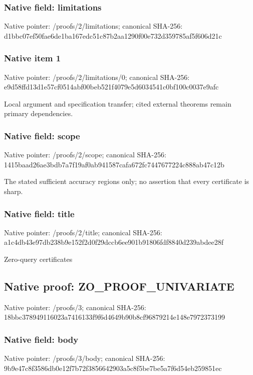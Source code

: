 \documentclass[10pt,a4paper]{article}
\begin{document}
\subsubsection{Native field: limitations}
Native pointer: /proofs/2/limitations; canonical SHA-256: d1bbc07ef50fae6de1ba167edc51c87b2aa1290f00e732d359785af5f606d21c

\subsubsection{Native item 1}
Native pointer: /proofs/2/limitations/0; canonical SHA-256: e9d58ffd13d1e57cf0514abf00beb521f4079e5d6034541c0bf100c0037e9afc

\begingroup\raggedright\sloppy Local argument and specification transfer;\allowbreak{} cited external theorems remain primary dependencies.\par\endgroup

\subsubsection{Native field: scope}
Native pointer: /proofs/2/scope; canonical SHA-256: 1415baad26ae3bdb7a7f19af0ab941587cafa672fc7447677224c888ab47c12b

\begingroup\raggedright\sloppy The stated sufficient accuracy regions only;\allowbreak{} no assertion that every certificate is sharp.\par\endgroup

\subsubsection{Native field: title}
Native pointer: /proofs/2/title; canonical SHA-256: a1c4db43e97db238b9e152f2d0f29dccb6ee901b91806fdf8840d239abdee28f

\begingroup\raggedright\sloppy Zero-query certificates\par\endgroup

\subsection{Native proof: ZO\_\allowbreak{}PROOF\_\allowbreak{}UNIVARIATE}
Native pointer: /proofs/3; canonical SHA-256: 18bbc378949116023a7416133f9f6d4649b90b8cf96879214e148e7972373199

\subsubsection{Native field: body}
Native pointer: /proofs/3/body; canonical SHA-256: 9b9e47c8f3586db0e12f7b72f3856642903a5c8f5be7be5a7f6d54eb259851ec
\end{document}
